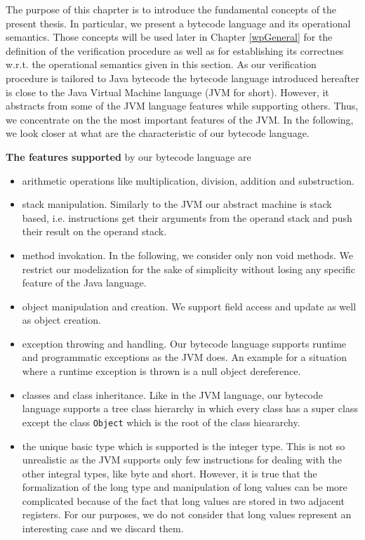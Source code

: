 
 The purpose of this chaprter is to introduce the fundamental concepts of the
 present thesis. In particular, we present a bytecode language 
 and its operational semantics. Those concepts will be used later in Chapter \ref{wpGeneral}
 for the definition of the verification
 procedure as well as for establishing 
 its correctnes w.r.t. the operational semantics
 given in this section. As our verification procedure is tailored to Java bytecode 
 the bytecode language introduced hereafter is close to the Java Virtual Machine 
 language \cite{VMSpec}(JVM for short). However, it abstracts from some of the JVM language
 features while supporting others. Thus, we concentrate on the 
the most important features of the JVM. In the following, we look closer at what are the characteristic of our bytecode language. 

\textbf{The features supported} by our bytecode language are 
\begin{itemize} 
   \item  arithmetic operations like multiplication, division, addition and substruction. 

   \item  stack manipulation. Similarly to the JVM  our abstract machine is stack based, i.e. instructions
          get their arguments from the operand stack and push their result on the  operand stack.

   \item  method invokation. In the following, we consider only  non void methods. 
          We restrict our modelization for the sake of simplicity without losing any specific feature of the Java language.
         
   \item  object manipulation and creation. We support field access and update as well as object creation. 

   \item  exception throwing and handling. Our bytecode language supports runtime and programmatic exceptions as the JVM does.
	  An example for a situation where a runtime exception is thrown is a null object dereference.  
   
   \item  classes and class inheritance. Like in the JVM language, our bytecode language supports  a tree class hierarchy in which every class 
          has a super class except the class \texttt{Object} which is the root of the class hieararchy.

   \item  the unique basic type which is supported is the integer type.
          This is not so unrealistic as the JVM supports only few instructions 
          for dealing with the other integral types, like byte and short. However, it is true that
	  the formalization of the long type and manipulation of long values can be more complicated because
	  of the fact that long values are stored in two adjacent registers. For our purposes, we do not consider  that 
	  long values represent an interesting case and we discard them.
	  
\end{itemize} 
 
